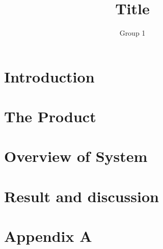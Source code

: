 \documentclass[12pt,a4paper]{article}
\begin{document}
\title{Title}
\author{Group 1}
 
\granskad{----}{\today}
\godkand{----}{\today}
\maketitle
\makestatus
\makeprojektidentitet
\makegruppmedlemmar
\makeprojektinfo
\makeinnehall

\section{Introduction}
\label{sec:Introduction}

\newpage
\section{The Product}
\label{sec:Product}

\newpage
\section{Overview of System}
\label{sec:Overview}

\newpage
\section{Result and discussion}
\label{sec:Result}

\newpage
\section*{Appendix A}
\label{sec:AppendixA}
\end{document}
